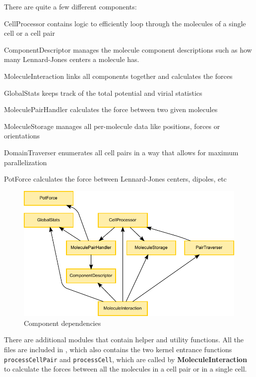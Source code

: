 There are quite a few different components:
\begin{compactdesc}
\item[CellProcessor] contains logic to efficiently loop through the molecules of a single cell or a cell pair
\item[ComponentDescriptor] manages the molecule component descriptions such as how many Lennard-Jones centers a molecule has.
\item[MoleculeInteraction] links all components together and calculates the forces
\item[GlobalStats] keeps track of the total potential and virial statistics
\item[MoleculePairHandler] calculates the force between two given molecules
\item[MoleculeStorage] manages all per-molecule data like positions, forces or orientations
\item[DomainTraverser] enumerates all cell pairs in a way that allows for maximum parallelization
\item[PotForce] calculates the force between Lennard-Jones centers, dipoles, etc
\end{compactdesc}

\begin{figure}
\caption{Component dependencies}
\includegraphics{figures/component_dependencies.pdf}
\end{figure}

There are additional \cuda{} modules that contain helper and utility functions.
All the  files are included in , which also contains the two kernel entrance functions \lstinline!processCellPair! and \lstinline!processCell!, which are called by \textbf{MoleculeInteraction} to calculate the forces between all the molecules in a cell pair or in a single cell.

